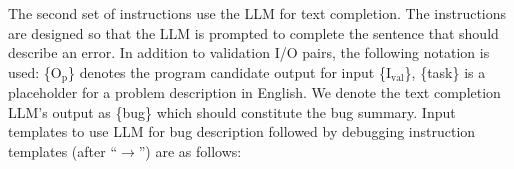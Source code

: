 The second set of instructions use the LLM for text completion. 
The instructions are designed so that the LLM is prompted to complete the sentence that should describe an error. 
In addition to validation I/O pairs, the following notation is used: \{O$_{\text{p}}$\} denotes the program candidate output for input \{I$_{\text{val}}$\}, \{task\} is a placeholder for a problem description in English. 
We denote the text completion LLM's output as \{bug\} which should constitute the bug summary.
Input templates to use LLM for bug description followed by debugging instruction templates (after ``$\rightarrow$'') are as follows:
